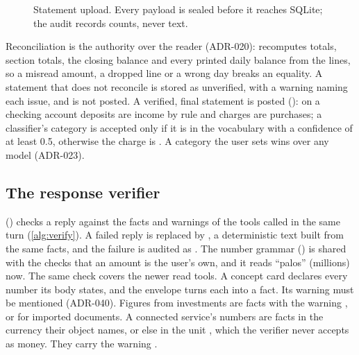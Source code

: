 \begin{figure}[htbp]
  \centering
  
  \caption{Statement upload. Every payload is sealed before it reaches SQLite; the audit records counts, never text.}\label{fig:dataflow}
\end{figure}

Reconciliation is the authority over the reader (ADR-020):  recomputes totals, section totals, the
closing balance and every printed daily balance from the lines, so a misread amount, a dropped line or a wrong day
breaks an equality. A statement that does not reconcile is stored as unverified, with a warning naming each issue, and
is not posted. A verified, final statement is posted (): on a checking account deposits are income
by rule and charges are purchases; a classifier's category is accepted only if it is in the vocabulary with a
confidence of at least 0.5, otherwise the charge is . A category the user sets wins over any model
(ADR-023).

\subsection{The response verifier}\label{sec:verifier}

 () checks a reply against the facts and warnings of the
tools called in the same turn (\cref{alg:verify}). A failed reply is replaced by , a deterministic text
built from the same facts, and the failure is audited as . The number grammar () is shared with the checks that an amount is the user's own, and
it reads ``palos'' (millions) now. The same check covers the newer read tools. A concept card declares every number its body states, and the envelope turns each into a fact. Its
 warning must be mentioned (ADR-040). Figures from investments are facts with the warning
, or  for imported documents. A connected service's
numbers are facts in the currency their object names, or else in the unit , which the verifier never
accepts as money. They carry the warning .

